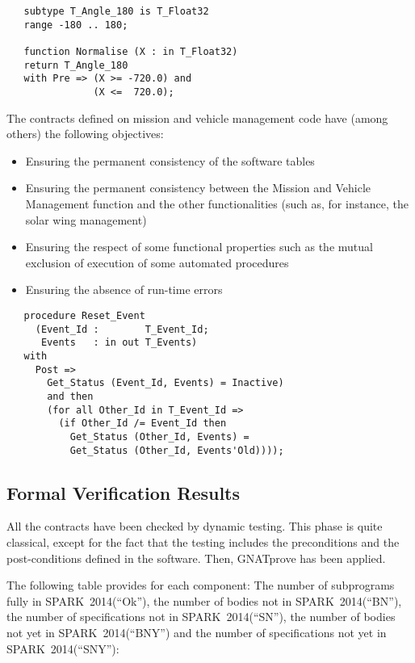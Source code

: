 \documentclass[10pt,a4paper,twocolumn]{article}
\newcommand{\gnatprove}{GNATprove\xspace}
\newcommand{\newspark}{SPARK~2014\xspace}
\begin{document}
\begin{lstlisting}
   subtype T_Angle_180 is T_Float32
   range -180 .. 180;

   function Normalise (X : in T_Float32)
   return T_Angle_180
   with Pre => (X >= -720.0) and
               (X <=  720.0);
\end{lstlisting}

The contracts defined on mission and vehicle management code have (among others) the following objectives:

\begin{itemize}
\item Ensuring the permanent consistency of the software tables
\item Ensuring the permanent consistency between the Mission and Vehicle Management function and the other functionalities (such as, for instance, the solar wing management)
\item Ensuring the respect of some functional properties such as the mutual exclusion of execution of some automated procedures
\item Ensuring the absence of run-time errors
\end{itemize}

\begin{lstlisting}
   procedure Reset_Event
     (Event_Id :        T_Event_Id;
      Events   : in out T_Events)
   with
     Post =>
       Get_Status (Event_Id, Events) = Inactive)
       and then
       (for all Other_Id in T_Event_Id =>
         (if Other_Id /= Event_Id then
           Get_Status (Other_Id, Events) =
           Get_Status (Other_Id, Events'Old))));
\end{lstlisting}

\subsection{Formal Verification Results}

All the contracts have been checked by dynamic testing. This phase is quite classical, except for the fact that the testing includes the preconditions and the post-conditions defined in the software. Then, \gnatprove has been applied.

The following table provides for each component:
The number of subprograms fully in \newspark (``Ok''),
the number of bodies not in \newspark (``BN''),
the number of specifications not in \newspark (``SN''),
the number of bodies not yet in \newspark (``BNY'') and
the number of specifications not yet in \newspark (``SNY''):
\end{document}
